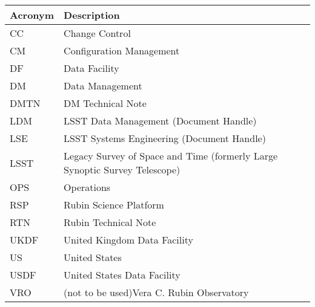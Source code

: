 \addtocounter{table}{-1}
\begin{longtable}{p{}p{}}\hline
\textbf{Acronym} & \textbf{Description}  \\\hline

CC & Change Control \\\hline
CM & Configuration Management \\\hline
DF & Data Facility \\\hline
DM & Data Management \\\hline
DMTN & DM Technical Note \\\hline
LDM & LSST Data Management (Document Handle) \\\hline
LSE & LSST Systems Engineering (Document Handle) \\\hline
LSST & Legacy Survey of Space and Time (formerly Large Synoptic Survey Telescope) \\\hline
OPS & Operations \\\hline
RSP & Rubin Science Platform \\\hline
RTN & Rubin Technical Note \\\hline
UKDF & United Kingdom Data Facility \\\hline
US & United States \\\hline
USDF & United States Data Facility \\\hline
VRO & (not to be used)Vera C. Rubin Observatory \\\hline
\end{longtable}
